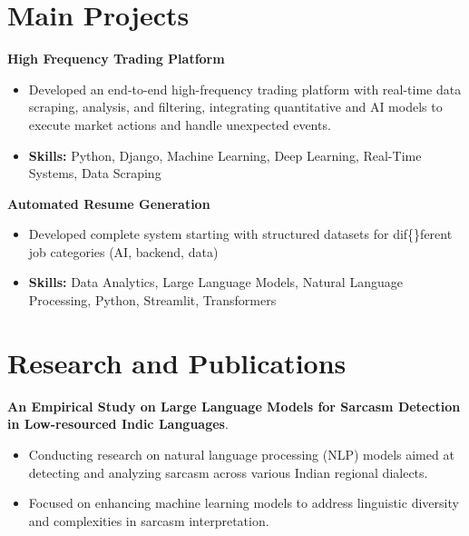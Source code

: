 \documentclass[a4paper,11pt]{article}
\begin{document}
\section{\textbf{Main Projects}}

\vspace{1mm}
  \textbf{High Frequency Trading Platform  }
\vspace{-1.5mm} %
\begin{itemize}
  \item Developed an end-to-end high-frequency trading platform with real-time data scraping, analysis, and filtering, integrating quantitative and AI models to execute market actions and handle unexpected events.
\vspace{-3mm}
  \item \textbf{Skills:} Python, Django, Machine Learning, Deep Learning, Real-Time Systems, Data Scraping
\end{itemize}


\vspace{1mm}
   \textbf{Automated Resume Generation }
\vspace{-1.5mm} %
\begin{itemize}
  \item Developed complete system starting with structured datasets for dif\{\}ferent job categories (AI, backend, data)
\vspace{-3mm}
  \item \textbf{Skills:} Data Analytics, Large Language Models, Natural Language Processing, Python, Streamlit, Transformers
\end{itemize}



\section{\textbf{Research and Publications} \hfill }
\vspace{1mm}
  \textbf{An Empirical Study on Large Language Models for Sarcasm Detection in Low-resourced Indic Languages}.
\vspace{-1mm} %
\begin{itemize}
  \item Conducting research on natural language processing (NLP) models aimed at detecting and analyzing sarcasm across various Indian regional dialects.
\vspace{-3mm}
  \item Focused on enhancing machine learning models to address linguistic diversity and complexities in sarcasm interpretation.
\end{itemize}
\end{document}

